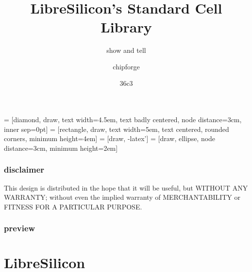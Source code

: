 \documentclass[aspectratio=169]{beamer}
\title{LibreSilicon's Standard Cell Library}
\subtitle{show and tell}
\author{chipforge}
\date{36c3}
\begin{document}
 = [diamond, draw, text width=4.5em, text badly centered, node distance=3cm, inner sep=0pt]
 = [rectangle, draw, text width=5em, text centered, rounded corners, minimum height=4em]
 = [draw, -latex']
 = [draw, ellipse, node distance=3cm, minimum height=2em]


\begin{frame}
\titlepage
\end{frame}


\begin{frame}
\frametitle{disclaimer} 
This design is distributed in the hope that it will be useful, but
\textsc{WITHOUT ANY WARRANTY}; without even the implied warranty of
\textsc{MERCHANTABILITY} or \textsc{FITNESS FOR A PARTICULAR PURPOSE}.
\end{frame}



\begin{frame}
\frametitle{preview}
\tableofcontents
\end{frame}

\section{LibreSilicon}

\end{document}
